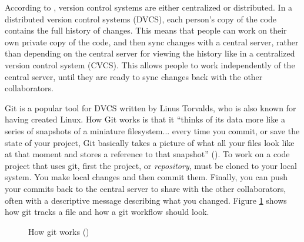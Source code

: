\documentclass[report.tex]{subfiles}
\begin{document}
According to \textcite{gitbook}, version control systems are either centralized or distributed. In a distributed version control systems (DVCS), each person's copy of the code contains the full history of changes. This means that people can work on their own private copy of the code, and then sync changes with a central server, rather than depending on the central server for viewing the history like in a centralized version control system (CVCS). This allows people to work independently of the central server, until they are ready to sync changes back with the other collaborators.

Git is a popular tool for DVCS written by Linus Torvalds, who is also known for having created Linux. How Git works is that it ``thinks of its data more like a series of snapshots of a miniature filesystem... every time you commit, or save the state of your project, Git basically takes a picture of what all your files look like at that moment and stores a reference to that snapshot'' (\cite[6]{gitbook}). To work on a code project that uses git, first the project, or \textit{repository}, must be cloned to your local system. You make local changes and then commit them. Finally, you can push your commits back to the central server to share with the other collaborators, often with a descriptive message describing what you changed. Figure \ref{fig:git} shows how git tracks a file and how a git workflow should look.

\begin{figure}[ht]
	\centering
	\hspace{0.1em}
	\caption{How git works (\cite[6, 8]{gitbook})}
	\label{fig:git}
\end{figure}
\end{document}
